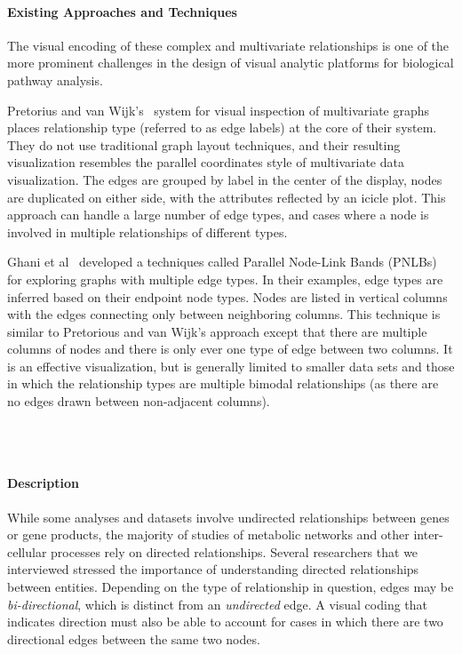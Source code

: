 \documentclass[twocolumn]{bmcart}%
\begin{document}
\paragraph*{Existing Approaches and Techniques}

The visual encoding of these complex and multivariate relationships is one of the more prominent challenges in the design of visual analytic platforms for biological pathway analysis.

Pretorius and van Wijk's~\cite{pretorius2008} system for visual inspection of multivariate graphs places relationship type (referred to as edge labels) at the core of their system.
They do not use traditional graph layout techniques, and their resulting visualization resembles the parallel coordinates style of multivariate data visualization.
The edges are grouped by label in the center of the display, nodes are duplicated on either side, with the attributes reflected by an icicle plot.
This approach can handle a large number of edge types, and cases where a node is involved in multiple relationships of different types.

Ghani et al~\cite{Ghani2013} developed a techniques called Parallel Node-Link Bands (PNLBs) for exploring graphs with multiple edge types.
In their examples, edge types are inferred based on their endpoint node types.
Nodes are listed in vertical columns with the edges connecting only between neighboring columns.
This technique is similar to Pretorious and van Wijk's approach except that there are multiple columns of nodes and there is only ever one type of edge between two columns.
It is an effective visualization, but is generally limited to smaller data sets and those in which the relationship types are multiple bimodal relationships (as there are no edges drawn between non-adjacent columns).


\ \\ \

\paragraph*{Description}

While some analyses and datasets involve undirected relationships between genes or gene products, the majority of studies of metabolic networks and other inter-cellular processes rely on directed relationships.
Several researchers that we interviewed stressed the importance of understanding directed relationships between entities.
Depending on the type of relationship in question, edges may be \textit{bi-directional}, which is distinct from an \textit{undirected} edge.
A visual coding that indicates direction must also be able to account for cases in which there are two directional edges between the same two nodes.
\end{document}
